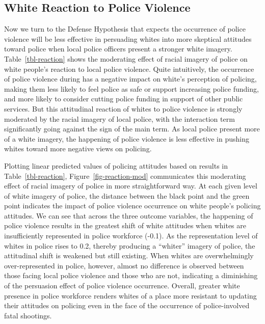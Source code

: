 \documentclass[
  12pt,
]{article}
\begin{document}
\hypertarget{white-reaction-to-police-violence}{%
\subsection{White Reaction to Police
Violence}\label{white-reaction-to-police-violence}}

Now we turn to the Defense Hypothesis that expects the occurrence of
police violence will be less effective in persuading whites into more
skeptical attitudes toward police when local police officers present a
stronger white imagery. Table~\ref{tbl-reaction} shows the moderating
effect of racial imagery of police on white people's reaction to local
police violence. Quite intuitively, the occurrence of police violence
during has a negative impact on white's perception of policing, making
them less likely to feel police as safe or support increasing police
funding, and more likely to consider cutting police funding in support
of other public services. But this attitudinal reaction of whites to
police violence is strongly moderated by the racial imagery of local
police, with the interaction term significantly going against the sign
of the main term. As local police present more of a white imagery, the
happening of police violence is less effective in pushing whites toward
more negative views on policing.

Plotting linear predicted values of policing attitudes based on results
in Table~\ref{tbl-reaction}, Figure~\ref{fig-reaction-mod} communicates
this moderating effect of racial imagery of police in more
straightforward way. At each given level of white imagery of police, the
distance between the black point and the green point indicates the
impact of police violence occurrence on white people's policing
attitudes. We can see that across the three outcome variables, the
happening of police violence results in the greatest shift of white
attitudes when whites are insufficiently represented in police workforce
(-0.1). As the representation level of whites in police rises to 0.2,
thereby producing a ``whiter'' imagery of police, the attitudinal shift
is weakened but still existing. When whites are overwhelmingly
over-represented in police, however, almost no difference is observed
between those facing local police violence and those who are not,
indicating a diminishing of the persuasion effect of police violence
occurrence. Overall, greater white presence in police workforce renders
whites of a place more resistant to updating their attitudes on policing
even in the face of the occurrence of police-involved fatal shootings.
\end{document}
